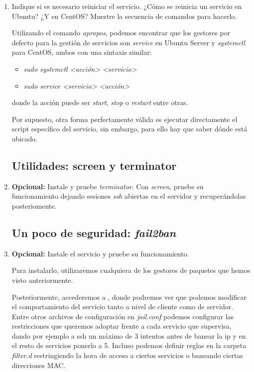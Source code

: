 \documentclass[paper=a4, fontsize=11pt]{scrartcl} %
\numberwithin{equation}{section} %
\numberwithin{figure}{section} %
\numberwithin{table}{section} %
\begin{document}
\begin{enumerate}
		
		\item Indique si es necesario reiniciar el servicio. ¿Cómo se reinicia un servicio en Ubuntu?
		¿Y en CentOS? Muestre la secuencia de comandos para hacerlo.
		
		Utilizando el comando \textit{apropos}\cite{man_apropos}, podemos encontrar que los gestores
		por defecto para la gestión de servicios son \textit{service}\cite{man_service} en Ubuntu Server
		y \textit{systemctl}\cite{man_systemctl} para CentOS, ambos con una sintaxis similar:
		
		\begin{itemize}
			\item \textit{sudo systemctl <acción> <servicio>}
			\item \textit{sudo service <servicio> <acción>}
		\end{itemize}
		donde la acción puede ser \textit{start}, \textit{stop} o \textit{restart} entre otras.
		
		Por supuesto, otra forma perfectamente válida es ejecutar directamente el script específico del
		servicio, sin embargo, para ello hay que saber dónde está ubicado.
		
		
	\subsection{Utilidades: screen y terminator}
		\item \textbf{Opcional:} Instale y pruebe \textit{terminator}. Con \textit{screen}, pruebe
		su funcionamiento dejando sesiones \textit{ssh} abiertas en el servidor y recuperándolas
		posteriomente.
	
	\subsection{Un poco de seguridad: \textit{fail2ban}}
		\item \textbf{Opcional:} Instale el servicio y pruebe su funcionamiento.
		
		Para instalarlo, utilizaremos cualquiera de los gestores de paquetes que hemos visto
		anteriormente.
		
		Posteriormente, accederemos a \cite{man_fail2ban}, donde podremos ver que podemos modificar
		el comportamiento del servicio tanto a nivel de cliente como de servidor. Entre otros archivos
		de configuración en \textit{jail.conf}\cite{man_jail.conf} podemos configurar las restricciones
		que queremos adoptar frente a cada servicio que supervisa, dando por ejemplo a ssh un máximo
		de 3 intentos antes de banear la ip y en el resto de servicios ponerlo a 5. Incluso podemos
		definir reglas en la carpeta \textit{filter.d} restringiendo la hora de acceso a ciertos
		servicios o baneando ciertas direcciones MAC.
		

\end{enumerate}
\end{document}
